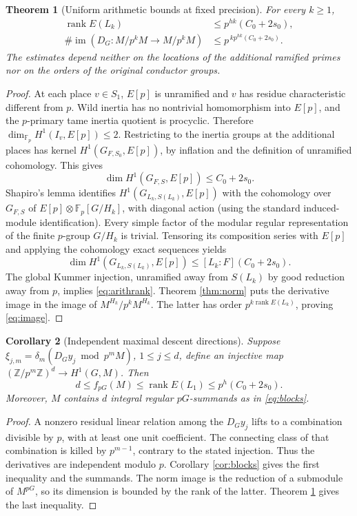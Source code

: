 \documentclass[11pt,a4paper]{article}
\newtheorem{theorem}{Theorem}[section]
\newtheorem{corollary}[theorem]{Corollary}
\theoremstyle{definition}
\theoremstyle{remark}
\newcommand{\Fp}{\mathbb F_p}
\newcommand{\rk}{\operatorname{rank}}
\newcommand{\im}{\operatorname{im}}
\begin{document}
\begin{theorem}[Uniform arithmetic bounds at fixed precision]\label{thm:arith}
For every $k\ge1$,
\begin{align}
 \rk E(L_k)&\le p^{hk}(C_0+2s_0),\label{eq:arithrank}\\
 \#\im(D_G:M/p^kM\to M/p^kM)
 &\le p^{\,kp^{hk}(C_0+2s_0)}.\label{eq:image}
\end{align}
The estimates depend neither on the locations of the additional ramified primes nor on the orders of the original conductor groups.
\end{theorem}
\begin{proof}
At each place $v\in S_1$, $E[p]$ is unramified and $v$ has residue characteristic different from $p$. Wild inertia has no nontrivial homomorphism into $E[p]$, and the $p$-primary tame inertia quotient is procyclic. Therefore $\dim_{\Fp}H^1(I_v,E[p])\le2$. Restricting to the inertia groups at the additional places has kernel $H^1(G_{F,S_0},E[p])$, by inflation and the definition of unramified cohomology. This gives
\[
 \dim H^1(G_{F,S},E[p])\le C_0+2s_0.
\]
Shapiro's lemma identifies $H^1(G_{L_k,S(L_k)},E[p])$ with the cohomology over $G_{F,S}$ of $E[p]\otimes\Fp[G/H_k]$, with diagonal action (using the standard induced-module identification). Every simple factor of the modular regular representation of the finite $p$-group $G/H_k$ is trivial. Tensoring its composition series with $E[p]$ and applying the cohomology exact sequences yields
\[
 \dim H^1(G_{L_k,S(L_k)},E[p])
 \le [L_k:F](C_0+2s_0).
\]
The global Kummer injection, unramified away from $S(L_k)$ by good reduction away from $p$, implies \eqref{eq:arithrank}. Theorem \ref{thm:norm} puts the derivative image in the image of $M^{H_k}/p^kM^{H_k}$. The latter has order $p^{k\rk E(L_k)}$, proving \eqref{eq:image}.
\end{proof}

\begin{corollary}[Independent maximal descent directions]\label{cor:ind}
Suppose $\xi_{j,m}=\delta_m(D_Gy_j\bmod p^mM)$, $1\le j\le d$, define an injective map $(\mathbb Z/p^m\mathbb Z)^d\to H^1(G,M)$. Then
\begin{equation}\label{eq:ind}
 d\le f_{pG}(M)\le \rk E(L_1)\le p^h(C_0+2s_0).
\end{equation}
Moreover, $M$ contains $d$ integral regular $pG$-summands as in \eqref{eq:blocks}.
\end{corollary}
\begin{proof}
A nonzero residual linear relation among the $D_Gy_j$ lifts to a combination divisible by $p$, with at least one unit coefficient. The connecting class of that combination is killed by $p^{m-1}$, contrary to the stated injection. Thus the derivatives are independent modulo $p$. Corollary \ref{cor:blocks} gives the first inequality and the summands. The norm image is the reduction of a submodule of $M^{pG}$, so its dimension is bounded by the rank of the latter. Theorem \ref{thm:arith} gives the last inequality.
\end{proof}
\end{document}
